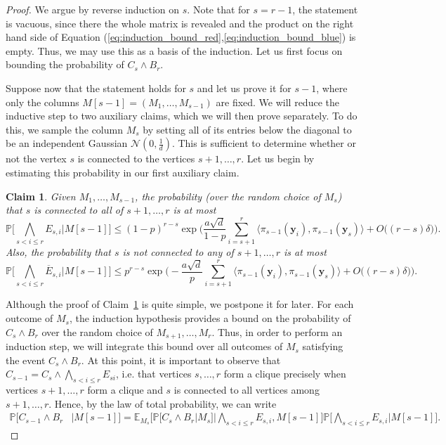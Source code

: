 \documentclass[10pt,a4paper]{amsart}
\newtheorem{claim}{Claim}
\def\Pb{\mathbb{P}}
\def\bE{\mathbb{E}}
\def\by{\boldsymbol{y}}
\def\cN{\mathcal{N}}
\begin{document}
\begin{proof}
We argue by reverse induction on $s$. Note that for $s=r-1$, the statement is vacuous, since there the whole matrix is revealed and the product on the right hand side of Equation (\ref{eq:induction_bound_red},\ref{eq:induction_bound_blue}) is empty. Thus, we may use this as a basis of the induction. Let us first focus on bounding the probability of $C_s\wedge B_r$.

Suppose now that the statement holds for $s$ and let us prove it for $s-1$, where only the columns $M[s-1]=(M_1, \dots, M_{s-1})$ are fixed. We will reduce the inductive step to two auxiliary claims, which we will then prove separately. To do this, we sample the column $M_s$ by setting all of its entries below the diagonal to be an independent Gaussian $\cN(0, \frac{1}{d})$. This is sufficient to determine whether or not the vertex $s$ is connected to the vertices $s+1, \dots, r$. Let us begin by estimating this probability in our first auxiliary claim.

\begin{claim}\label{claim:auxiliary_1}
Given $M_1, \dots, M_{s-1}$, the probability (over the random choice of $M_s$) that $s$ is connected to all of $s+1, \dots, r$ is at most
{\smaller[0.3]
\begin{equation}\label{eq:auxiliary_1_blue}
    \Pb\bigg[\bigwedge_{s<i\leq r}E_{s, i}\bigg|M[s\!-\!1]\bigg]\leq (1\!-\!p)^{r-s}\exp\bigg(\frac{a\sqrt{d}}{1\!-\!p}\sum_{i=s+1}^r \langle \pi_{s-1}(\by_i), \pi_{s-1}(\by_s)\rangle\!+\!O\big((r\!-\!s)\delta\big)\bigg).
\end{equation}
}
Also, the probability that $s$ is not connected to any of $s+1, \dots, r$ is at most
{\smaller[0.3]
\begin{equation}\label{eq:auxiliary_1_red}
    \Pb\bigg[\bigwedge_{s<i\leq r}\overline{E}_{s, i}\bigg|M[s\!-\!1]\bigg]\leq
    p^{r-s}\exp\bigg(\!-\!\frac{a\sqrt{d}}{p}\sum_{i=s+1}^r \langle \pi_{s-1}(\by_i), \pi_{s-1}(\by_s)\rangle\!+\!O\big((r\!-\!s)\delta\big)\bigg).
\end{equation}
}
\end{claim}

Although the proof of Claim~\ref{claim:auxiliary_1} is quite simple, we postpone it for later. For each outcome of $M_s$, the induction hypothesis provides a bound on the probability of $C_s\wedge B_r$ over the random choice of $M_{s+1}, \dots, M_r$. Thus, in order to perform an induction step, we will integrate this bound over all outcomes of $M_s$ satisfying the event $C_s\wedge B_r$. At this point, it is important to observe that $C_{s-1}=C_{s}\wedge \bigwedge_{s<i\leq r}E_{si}$, i.e. that vertices $s, \dots, r$ form a clique precisely when vertices $s+1, \dots, r$ form a clique and $s$ is connected to all vertices among $s+1, \dots, r$. Hence, by the law of total probability, we can write
{\smaller[0.3]
\begin{align}\label{eq:total_probability_blue}
\Pb\Big[C_{s\!-\!1}\wedge B_r&\Big| M[s\!-\!1]\Big] =\bE_{M_s}\bigg[\Pb\Big[C_{s}\wedge B_r\Big| M_{s}\Big]\bigg| \bigwedge_{s<i\leq r}E_{s, i}, M[s\!-\!1]\bigg]\Pb\bigg[\bigwedge_{s<i\leq r}E_{s, i}\bigg|M[s\!-\!1]\bigg].
\end{align}
}


\end{proof}
\end{document}
